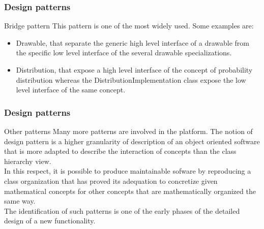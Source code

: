 \documentclass[8pt]{beamer}
\begin{document}
\begin{frame}
  \frametitle{Design patterns}

  \begin{block}{Bridge pattern}
    This pattern is one of the most widely used. Some examples are:
    \begin{itemize}
    \item \alert{Drawable}, that separate the generic high level interface of a drawable from the specific low level interface of the several drawable specializations.
    \item \alert{Distribution}, that expose a high level interface of the concept of probability distribution whereas the DistributionImplementation class expose the low level interface of the same concept.
    \end{itemize}
  \end{block}
  \centering {}
\end{frame}
\begin{frame}
  \frametitle{Design patterns}
  \begin{block}{Other patterns}
    Many more patterns are involved in the platform. The notion of design pattern is a higher granularity of description of an object oriented software that is more adapted to describe the interaction of concepts than the class hierarchy view.\\
    In this respect, it is possible to produce maintainable sofware by reproducing a class organization that has proved its adequation to concretize given mathematical concepts for other concepts that are mathematically organized the same way.\\
    The identification of such patterns is one of the early phases of the detailed design of a new functionality.
  \end{block}
\end{frame}
\end{document}

